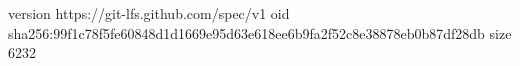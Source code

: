version https://git-lfs.github.com/spec/v1
oid sha256:99f1c78f5fe60848d1d1669e95d63e618ee6b9fa2f52c8e38878eb0b87df28db
size 6232
